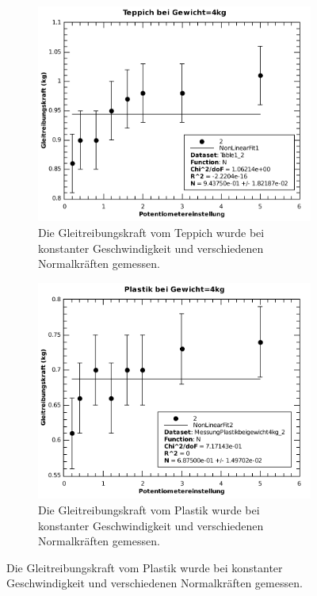 \begin{figure}[H]
    \centering
    \begin{subfigure}{.7\textwidth}
        \includegraphics[width=\linewidth]{images/teppich_const_gewicht}
        \caption{Die Gleitreibungskraft vom Teppich wurde bei konstanter Geschwindigkeit und verschiedenen Normalkr\"aften gemessen.}
        \label{fig:teppich_const_gewicht}
    \end{subfigure}
    \begin{subfigure}{.7\textwidth}
        \includegraphics[width=\linewidth]{images/plastik_const_gewicht}
        \caption{Die Gleitreibungskraft vom Plastik wurde bei konstanter Geschwindigkeit und verschiedenen Normalkr\"aften gemessen.}
        \label{fig:plastik_const_gewicht}
    \end{subfigure}
\end{figure}

